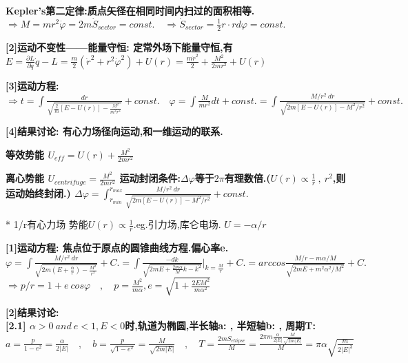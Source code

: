         \bf{Kepler's第二定律}:质点矢径在相同时间内扫过的面积相等.
            $\Rightarrow M = m r^2 \dot \varphi = 2 m \dot S_{sector} = const.\quad \Rightarrow \dot S_{sector} = \frac{1}{2} r \cdot r d\varphi = const.$
    
        \bf{[2]运动不变性——能量守恒}: 定常外场下能量守恒,有
            $E = \frac{\partial L}{\partial \dot q}\dot q - L = \frac{m}{2} (\dot r^2 + r^2 \dot \varphi ^2) + U(r) = \frac{m \dot r^2}{2} + \frac{M^2}{2mr^2} + U(r)$
    
        \bf{[3]运动方程}:
            $\Rightarrow t = \int \frac{d r}{\sqrt{\frac{2}{m}[E-U(r)] - \frac{M^2}{m^2 r^2}}} + const. \quad \varphi = \int \frac{M}{m r^2} d t  + const.= \int \frac{M/r^2\ dr}{\sqrt{2m [E-U(r)] - M^2/r^2}} + const.$
    
        \bf{[4]结果讨论}: 有心力场径向运动,和一维运动的联系.
    
        \bf{等效势能}
            $U_{eff} = U(r) + \frac{M^2}{2mr^2}$
    
        \bf{离心势能}
            $U_{centrifuge} = \frac{M^2}{2mr^2}$
            运动封闭条件:$\Delta \varphi$等于$2\pi$有理数倍.\quad($U(r) \propto \frac{1}{r}\ ,\ r^2$,则运动始终封闭.)
            $\Delta \varphi = \int_{r_{min}} ^{r_{max}} \frac{M/r^2\ dr}{\sqrt{2m [E-U(r)] - M^2/r^2}} + const.$
    

        * 1/r有心力场
        势能$U(r) \propto \frac{1}{r}$.\quad eg.引力场,库仑电场.
            $U = - \alpha / r$
            
        \bf{[1]运动方程}: 焦点位于原点的圆锥曲线方程.\quad 偏心率e.
            $\varphi = \int \frac{M/r^2\ dr}{\sqrt{2m (E+\frac{\alpha}{r}) - \frac{M^2}{r^2}}} + C. = \int \frac{-dk}{\sqrt{2mE + \frac{2m\alpha}{M}k - k^2}}|_{k = \frac{M}{r}} + C. = arccos\frac{M/r - m\alpha /M}{\sqrt{2mE + m^2 \alpha ^2 /M^2}} + C.$
            $\Rightarrow p/r = 1 + e \ cos \varphi \quad , \quad p = \frac{M^2}{m\alpha} , e = \sqrt{1 + \frac{2 E M^2}{m \alpha^2}}$
            
        \bf{[2]结果讨论}: \\
        
        \bf{[2.1] $\alpha > 0\ and\ e<1, E<0$时,轨道为椭圆}\quad,半长轴a: \quad , 半短轴b: \quad , 周期T:
        $a = \frac{p}{1-e^2} = \frac{\alpha}{2|E|} \quad , \quad b = \frac{p}{\sqrt{1-e^2}} = \frac{M}{\sqrt{2m|E|}} \quad , \quad T = \frac{2mS_{ellipse}}{M} = \frac{2\pi m \frac{\alpha}{2|E|} \frac{M}{\sqrt{2m|E|}}}{M} = \pi \alpha \sqrt{\frac{m}{2|E|^3}} $
        
